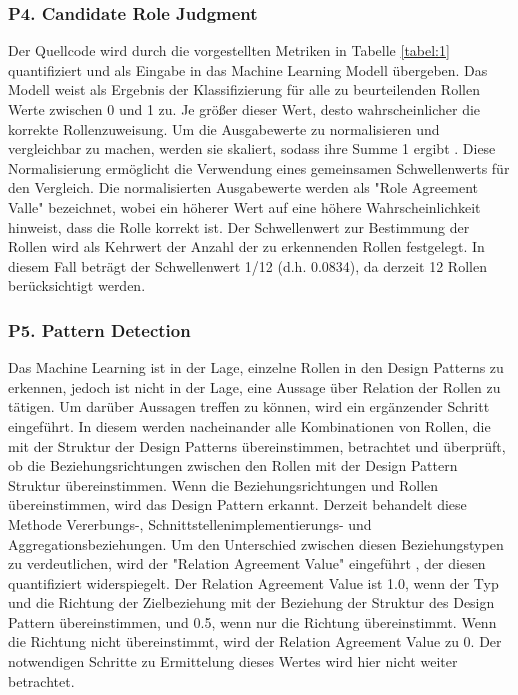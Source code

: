 \documentclass[conference]{IEEEtran}
\begin{document}
\subsubsection*{P4. Candidate Role Judgment}

Der Quellcode wird durch die vorgestellten Metriken in Tabelle \ref*{tabel:1} quantifiziert und als Eingabe in das Machine Learning Modell übergeben. Das Modell weist als Ergebnis der Klassifizierung für alle zu beurteilenden Rollen Werte zwischen 0 und 1 zu. Je größer dieser Wert, desto wahrscheinlicher die korrekte Rollenzuweisung.
Um die Ausgabewerte zu normalisieren und vergleichbar zu machen, werden sie skaliert, sodass ihre Summe 1 ergibt \cite[p. 5]{dodmetrics}. Diese Normalisierung ermöglicht die Verwendung eines gemeinsamen Schwellenwerts für den Vergleich. Die normalisierten Ausgabewerte werden als "Role Agreement Valle" bezeichnet, wobei ein höherer Wert auf eine höhere Wahrscheinlichkeit hinweist, dass die Rolle korrekt ist.
Der Schwellenwert zur Bestimmung der Rollen wird als Kehrwert der Anzahl der zu erkennenden Rollen festgelegt. In diesem Fall beträgt der Schwellenwert 1/12 (d.h. 0.0834), da derzeit 12 Rollen berücksichtigt werden.

\subsubsection*{P5. Pattern Detection}

Das Machine Learning ist in der Lage, einzelne Rollen in den Design Patterns zu erkennen, jedoch ist nicht in der Lage, eine Aussage über Relation der Rollen zu tätigen. Um darüber Aussagen treffen zu können, wird ein ergänzender Schritt eingeführt. In diesem werden nacheinander alle Kombinationen von Rollen, die mit der Struktur der Design Patterns übereinstimmen, betrachtet und überprüft, ob die Beziehungsrichtungen zwischen den Rollen mit der Design Pattern Struktur übereinstimmen.
Wenn die Beziehungsrichtungen und Rollen übereinstimmen, wird das Design Pattern erkannt. Derzeit behandelt diese Methode Vererbungs-, Schnittstellenimplementierungs- und Aggregationsbeziehungen. Um den Unterschied zwischen diesen Beziehungstypen zu verdeutlichen, wird der "Relation Agreement Value" eingeführt \cite[p. 6]{dodmetrics}, der diesen quantifiziert widerspiegelt. Der Relation Agreement Value ist 1.0, wenn der Typ und die Richtung der Zielbeziehung mit der Beziehung der Struktur des Design Pattern übereinstimmen, und 0.5, wenn nur die Richtung übereinstimmt. Wenn die Richtung nicht übereinstimmt, wird der Relation Agreement Value zu 0.
Der notwendigen Schritte zu Ermittelung dieses Wertes wird hier nicht weiter betrachtet.
\end{document}
